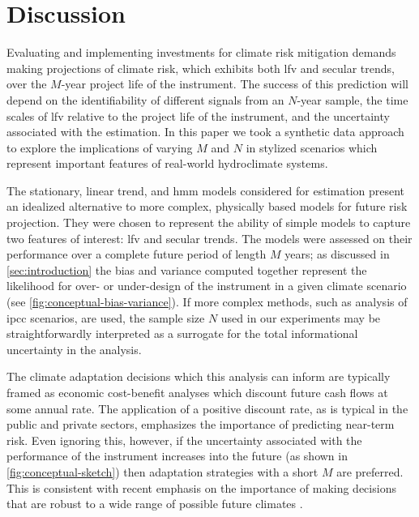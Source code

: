 \documentclass[
]{agujournal2018}
\makeatletter
\newcommand{\ie}{i.e.\@\xspace}
\makeatother
\begin{document}

\clearpage
\section{Discussion}\label{sec:discussion-conclusions}

Evaluating and implementing investments for climate risk mitigation demands making projections of climate risk, which exhibits both \gls{lfv} and secular trends, over the $M$-year project life of the instrument.
The success of this prediction will depend on the identifiability of different signals from an $N$-year sample, the time scales of \gls{lfv} relative to the project life of the instrument, and the uncertainty associated with the estimation.
In this paper we took a synthetic data approach to explore the implications of varying $M$ and $N$ in stylized scenarios which represent important features of real-world hydroclimate systems.

The stationary, linear trend, and \gls{hmm} models considered for estimation present an idealized alternative to more complex, physically based models for future risk projection.
They were chosen to represent the ability of simple models to capture two features of interest: \gls{lfv} and secular trends.
The models were assessed on their performance over a complete future period of length $M$ years; as discussed in \cref{sec:introduction} the bias and variance computed together represent the likelihood for over- or under-design of the instrument in a given climate scenario (see \cref{fig:conceptual-bias-variance}).
If more complex methods, such as analysis of \gls{ipcc} scenarios, are used, the sample size $N$ used in our experiments may be straightforwardly interpreted as a surrogate for the total informational uncertainty in the analysis.

The climate adaptation decisions which this analysis can inform are typically framed as economic cost-benefit analyses which discount future cash flows at some annual rate.
The application of a positive discount rate, as is typical in the public and private sectors, emphasizes the importance of predicting near-term risk.
Even ignoring this, however, if the uncertainty associated with the performance of the instrument increases into the future (as shown in \cref{fig:conceptual-sketch}) then adaptation strategies with a short $M$ are preferred.
This is consistent with recent emphasis on the importance of making decisions that are robust to a wide range of possible future climates \citep[\ie,][]{Haasnoot:2013im, Poff:2015jn}.
\end{document}
